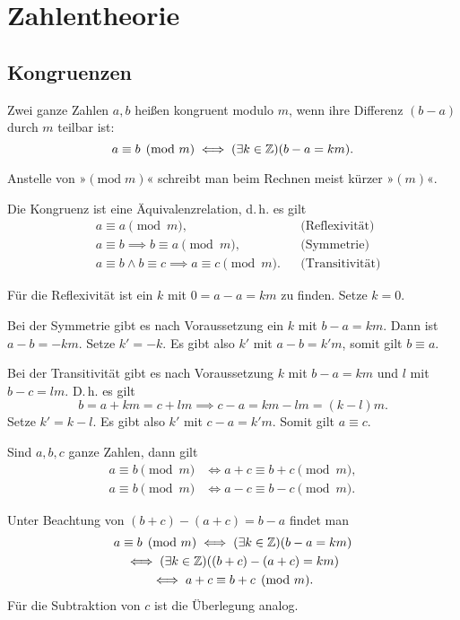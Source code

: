 
\chapter{Zahlentheorie}

\section{Kongruenzen}

\begin{Definition}[Kongruenz]
Zwei ganze Zahlen $a,b$ heißen kongruent modulo $m$, wenn ihre Differenz
$(b-a)$ durch $m$ teilbar ist:%
\[a\equiv b\pmod{m}\iff (\exists k\in\mathbb Z)(b-a=km).\]
\end{Definition}
Anstelle von »$(\mathrm{mod}\;m)$« schreibt man beim Rechnen meist
kürzer »$(m)$«.

\begin{Satz}
Die Kongruenz ist eine Äquivalenzrelation, d.\,h. es gilt
\begin{align*}
&a\equiv a\pmod{m},&&\text{(Reflexivität)}\\
&a\equiv b\implies b\equiv a\pmod{m},&&\text{(Symmetrie)}\\
&a\equiv b\land b\equiv c\implies a\equiv c\pmod{m}.&&\text{(Transitivität)}
\end{align*}
\end{Satz}
 Für die Reflexivität ist ein $k$ mit $0=a-a=km$
zu finden. Setze $k=0$.

Bei der Symmetrie gibt es nach Voraussetzung
ein $k$ mit $b-a=km$. Dann ist $a-b=-km$. Setze $k'=-k$.
Es gibt also $k'$ mit $a-b=k'm$, somit gilt $b\equiv a$.

Bei der Transitivität gibt es nach Voraussetzung $k$ mit
$b-a=km$ und $l$ mit $b-c=lm$. D.\,h. es gilt
\[b = a+km = c+lm\implies c-a = km-lm = (k-l)m.\]
Setze $k'=k-l$. Es gibt also $k'$ mit $c-a=k'm$. Somit gilt $a\equiv c$.\;\qedsymbol

\begin{Satz}
Sind $a,b,c$ ganze Zahlen, dann gilt
\begin{align*}
a\equiv b\pmod{m}&\iff a+c\equiv b+c\pmod{m},\\
a\equiv b\pmod{m}&\iff a-c\equiv b-c\pmod{m}.
\end{align*}
\end{Satz}
Unter Beachtung von $(b+c)-(a+c)=b-a$ findet man
\begin{gather*}
a\equiv b\pmod{m}
\iff (\exists k\in\mathbb Z)(b-a=km)\\
\iff (\exists k\in\mathbb Z)((b+c)-(a+c)=km)\\
\iff a+c\equiv b+c\pmod{m}.
\end{gather*}
Für die Subtraktion von $c$ ist die Überlegung analog.\;\qedsymbol

